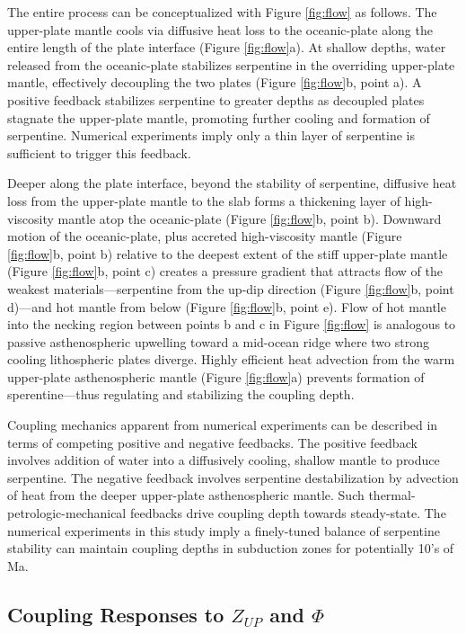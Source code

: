 The entire process can be conceptualized with Figure \ref{fig:flow} as follows. The upper-plate mantle cools via diffusive heat loss to the oceanic-plate along the entire length of the plate interface (Figure \ref{fig:flow}a). At shallow depths, water released from the oceanic-plate stabilizes serpentine in the overriding upper-plate mantle, effectively decoupling the two plates (Figure \ref{fig:flow}b, point a). A positive feedback stabilizes serpentine to greater depths as decoupled plates stagnate the upper-plate mantle, promoting further cooling and formation of serpentine. Numerical experiments imply only a thin layer of serpentine is sufficient to trigger this feedback.

Deeper along the plate interface, beyond the stability of serpentine, diffusive heat loss from the upper-plate mantle to the slab forms a thickening layer of high-viscosity mantle atop the oceanic-plate (Figure \ref{fig:flow}b, point b). Downward motion of the oceanic-plate, plus accreted high-viscosity mantle (Figure \ref{fig:flow}b, point b) relative to the deepest extent of the stiff upper-plate mantle (Figure \ref{fig:flow}b, point c) creates a pressure gradient that attracts flow of the weakest materials---serpentine from the up-dip direction (Figure \ref{fig:flow}b, point d)---and hot mantle from below (Figure \ref{fig:flow}b, point e). Flow of hot mantle into the necking region between points b and c in Figure \ref{fig:flow} is analogous to passive asthenospheric upwelling toward a mid-ocean ridge where two strong cooling lithospheric plates diverge. Highly efficient heat advection from the warm upper-plate asthenospheric mantle (Figure \ref{fig:flow}a) prevents formation of sperentine---thus regulating and stabilizing the coupling depth.

Coupling mechanics apparent from numerical experiments can be described in terms of competing positive and negative feedbacks. The positive feedback involves addition of water into a diffusively cooling, shallow mantle to produce serpentine. The negative feedback involves serpentine destabilization by advection of heat from the deeper upper-plate asthenospheric mantle. Such thermal-petrologic-mechanical feedbacks drive coupling depth towards steady-state. The numerical experiments in this study imply a finely-tuned balance of serpentine stability can maintain coupling depths in subduction zones for potentially 10's of Ma.

\hypertarget{cplResponses}{%
\subsection{\texorpdfstring{Coupling Responses to \(Z_{UP}\) and \(\Phi\)}{Coupling Responses to Z\_\{UP\} and \textbackslash Phi}}\label{cplResponses}}


